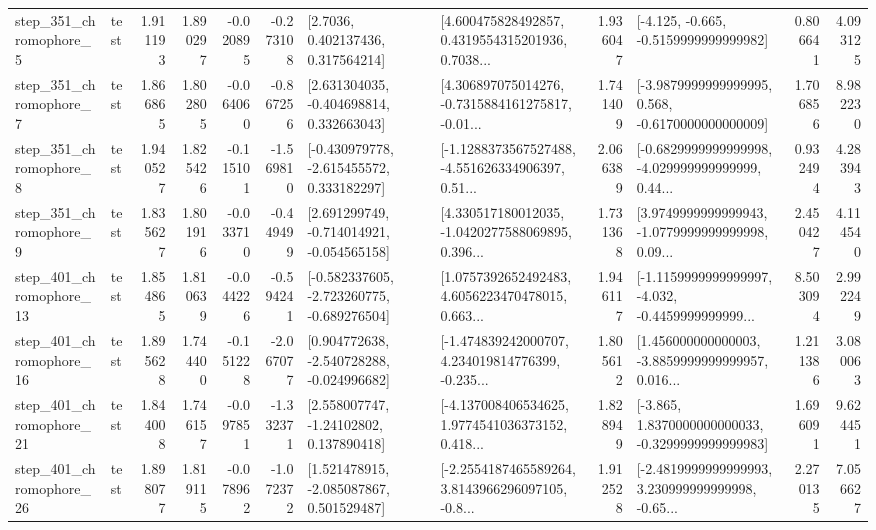 \begin{tabular}{llrrrrllrlrr}
   step\_351\_chromophore\_5 &      test &      1.911193 &    1.890297 &     -0.020895 & -0.273108 &          [2.7036, 0.402137436, 0.317564214] &  [4.600475828492857, 0.4319554315201936, 0.7038... &       1.936047 &              [-4.125, -0.665, -0.5159999999999982] &            0.806641 &          4.093125 \\
   step\_351\_chromophore\_7 &      test &      1.866865 &    1.802805 &     -0.064060 & -0.867256 &    [2.631304035, -0.404698814, 0.332663043] &  [4.306897075014276, -0.7315884161275817, -0.01... &       1.741409 &  [-3.9879999999999995, 0.568, -0.6170000000000009] &            1.706856 &          8.982230 \\
   step\_351\_chromophore\_8 &      test &      1.940527 &    1.825426 &     -0.115101 & -1.569810 &   [-0.430979778, -2.615455572, 0.333182297] &  [-1.1288373567527488, -4.551626334906397, 0.51... &       2.066389 &  [-0.6829999999999998, -4.029999999999999, 0.44... &            0.932494 &          4.283943 \\
   step\_351\_chromophore\_9 &      test &      1.835627 &    1.801916 &     -0.033710 & -0.449499 &   [2.691299749, -0.714014921, -0.054565158] &  [4.330517180012035, -1.0420277588069895, 0.396... &       1.731368 &  [3.9749999999999943, -1.0779999999999998, 0.09... &            2.450427 &          4.114540 \\
  step\_401\_chromophore\_13 &      test &      1.854865 &    1.810639 &     -0.044226 & -0.594241 &  [-0.582337605, -2.723260775, -0.689276504] &  [1.0757392652492483, 4.6056223470478015, 0.663... &       1.946117 &  [-1.1159999999999997, -4.032, -0.4459999999999... &            8.503094 &          2.992249 \\
  step\_401\_chromophore\_16 &      test &      1.895628 &    1.744400 &     -0.151228 & -2.067077 &   [0.904772638, -2.540728288, -0.024996682] &  [-1.474839242000707, 4.234019814776399, -0.235... &       1.805612 &  [1.456000000000003, -3.8859999999999957, 0.016... &            1.211386 &          3.080063 \\
  step\_401\_chromophore\_21 &      test &      1.844008 &    1.746157 &     -0.097851 & -1.332371 &     [2.558007747, -1.24102802, 0.137890418] &  [-4.137008406534625, 1.9774541036373152, 0.418... &       1.828949 &  [-3.865, 1.8370000000000033, -0.3299999999999983] &            1.696091 &          9.624451 \\
  step\_401\_chromophore\_26 &      test &      1.898077 &    1.819115 &     -0.078962 & -1.072372 &    [1.521478915, -2.085087867, 0.501529487] &  [-2.2554187465589264, 3.8143966296097105, -0.8... &       1.912528 &  [-2.4819999999999993, 3.230999999999998, -0.65... &            2.270135 &          7.056627 \\

\end{tabular}
